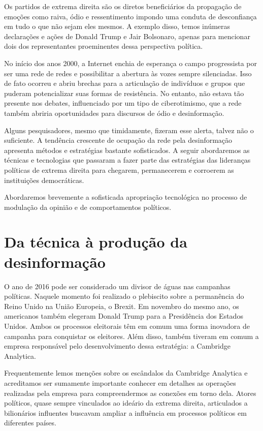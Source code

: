 Os partidos de extrema direita são os diretos beneficiários da
propagação de emoções como raiva, ódio e ressentimento impondo uma
conduta de desconfiança em tudo o que não sejam eles mesmos. A exemplo
disso, temos inúmeras declarações e ações de Donald Trump e Jair
Bolsonaro, apenas para mencionar dois dos representantes proeminentes
dessa perspectiva política.

No início dos anos 2000, a Internet enchia de esperança o campo
progressista por ser uma rede de redes e possibilitar a abertura às
vozes sempre silenciadas. Isso de fato ocorreu e abriu brechas para a
articulação de indivíduos e grupos que puderam potencializar suas formas
de resistência. No entanto, não estava tão presente nos debates,
influenciado por um tipo de ciberotimismo, que a rede também abriria
oportunidades para discursos de ódio e desinformação.

Alguns pesquisadores, mesmo que timidamente, fizeram esse alerta, talvez
não o suficiente. A tendência crescente de ocupação da rede pela
desinformação apresenta métodos e estratégias bastante sofisticados. A
seguir abordaremos as técnicas e tecnologias que passaram a fazer parte
das estratégias das lideranças políticas de extrema direita para
chegarem, permanecerem e corroerem as instituições democráticas.

Abordaremos brevemente a sofisticada apropriação tecnológica no processo
de modulação da opinião e de comportamentos políticos.

\section{Da técnica à produção da desinformação}

O ano de 2016 pode ser considerado um divisor de águas nas campanhas
políticas. Naquele momento foi realizado o plebiscito sobre a
permanência do Reino Unido na União Europeia, o Brexit. Em novembro do
mesmo ano, os americanos também elegeram Donald Trump para a Presidência
dos Estados Unidos. Ambos os processos eleitorais têm em comum uma
forma inovadora de campanha para conquistar os eleitores. Além disso,
também tiveram em comum a empresa responsável pelo desenvolvimento dessa
estratégia: a Cambridge Analytica.

Frequentemente lemos menções sobre os escândalos da Cambridge Analytica
e acreditamos ser sumamente importante conhecer em detalhes as operações
realizadas pela empresa para compreendermos as conexões em torno dela.
Atores políticos, quase sempre vinculados ao ideário da extrema direita,
articulados a bilionários influentes buscavam ampliar a influência em
processos políticos em diferentes países.

